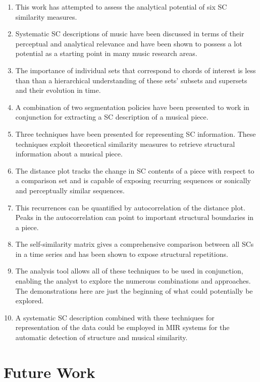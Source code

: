 \documentclass{article}
\begin{document}
\begin{enumerate}
\item This work has attempted to assess the analytical potential of six SC
   similarity measures.
\item Systematic SC descriptions of music have been discussed in terms of
   their perceptual and analytical relevance and have been shown to
   possess a lot potential as a starting point in many music research
   areas.
\item The importance of individual sets that correspond to chords of
   interest is less than than a hierarchical understanding of these
   sets' subsets and supersets and their evolution in time.
\item A combination of two segmentation policies have been presented to
   work in conjunction for extracting a SC description of a musical
   piece.
\item Three techniques have been presented for representing SC
   information. These techniques exploit theoretical similarity
   measures to retrieve structural information about a musical piece.
\item The distance plot tracks the change in SC contents of a piece with
   respect to a comparison set and is capable of exposing recurring
   sequences or sonically and perceptually similar sequences.
\item This recurrences can be quantified by autocorrelation of the
   distance plot. Peaks in the autocorrelation can point to important
   structural boundaries in a piece.
\item The self-similarity matrix gives a comprehensive comparison between
   all SCs in a time series and has been shown to expose structural
   repetitions.
\item The analysis tool allows all of these techniques to be used in
   conjunction, enabling the analyst to explore the numerous
   combinations and approaches. The demonstrations here are just the
   beginning of what could potentially be explored.
\item A systematic SC description combined with these techniques for
    representation of the data could be employed in MIR systems for the
    automatic detection of structure and musical similarity.
\end{enumerate}
\section{Future Work}
\label{sec-12}
\end{document}
